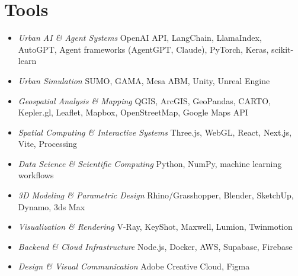 \section*{Tools}

\begin{itemize}
    \item \textit{Urban AI \& Agent Systems} \tab OpenAI API, LangChain, LlamaIndex, AutoGPT, Agent frameworks (AgentGPT, Claude), PyTorch, Keras, scikit-learn
    \item \textit{Urban Simulation} \tab SUMO, GAMA, Mesa ABM, Unity, Unreal Engine
    \item \textit{Geospatial Analysis \& Mapping} \tab QGIS, ArcGIS, GeoPandas, CARTO, Kepler.gl, Leaflet, Mapbox, OpenStreetMap, Google Maps API
    \item \textit{Spatial Computing \& Interactive Systems} \tab Three.js, WebGL, React, Next.js, Vite, Processing
    \item \textit{Data Science \& Scientific Computing} \tab Python, NumPy, machine learning workflows
    \item \textit{3D Modeling \& Parametric Design} \tab Rhino/Grasshopper, Blender, SketchUp, Dynamo, 3ds Max
    \item \textit{Visualization \& Rendering} \tab V-Ray, KeyShot, Maxwell, Lumion, Twinmotion
    \item \textit{Backend \& Cloud Infrastructure} \tab Node.js, Docker, AWS, Supabase, Firebase
    \item \textit{Design \& Visual Communication} \tab Adobe Creative Cloud, Figma
\end{itemize}





















